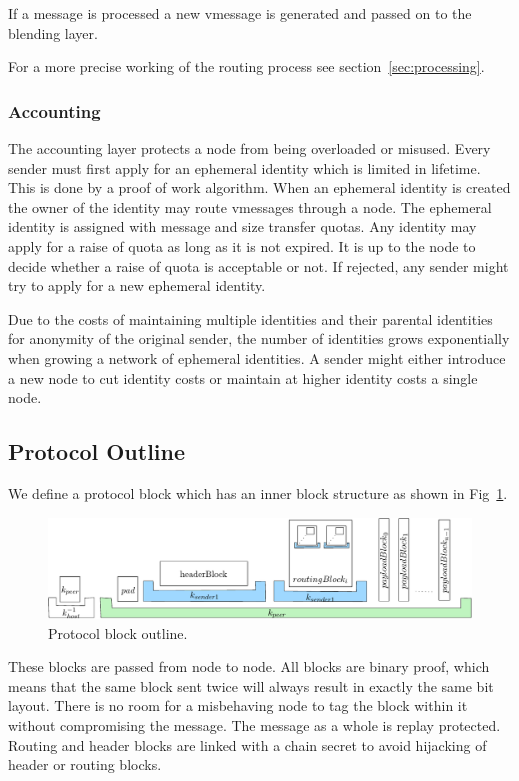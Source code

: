 \documentclass[9pt,journal,compsoc]{IEEEtran}
\begin{document}
If a message is processed a new vmessage is generated and passed on to the blending layer.

For a more precise working of the routing process see section~\ref{sec:processing}.

\subsubsection{Accounting}
The accounting layer protects a node from being overloaded or misused. Every sender must first apply for an ephemeral identity which is limited in lifetime. This is done by a proof of work algorithm. When an ephemeral identity is created the owner of the identity may route vmessages through a node. The ephemeral identity is assigned with message and size transfer quotas. Any identity may apply for a raise of quota as long as it is not expired. It is up to the node to decide whether a raise of quota is acceptable or not. If rejected, any sender might try to apply for a new ephemeral identity.

Due to the costs of maintaining multiple identities and their parental identities for anonymity of the original sender, the number of identities grows exponentially when growing a network of ephemeral identities. A sender might either introduce a new node to cut identity costs or maintain at higher identity costs a single node.

\subsection{Protocol Outline}
We define a protocol block which has an inner block structure as shown in Fig~\ref{fig:blocks}.

\begin{figure}[htb]
	\centering
	\includegraphics[width=\columnwidth]{../inc/blockLayoutSimplified}
	\caption{Protocol block outline.}
	\label{fig:blocks}
\end{figure}

These blocks are passed from node to node. All blocks are binary proof, which means that the same block sent twice will always result in exactly the same bit layout. There is no room for a misbehaving node to tag the block within it without compromising the message. The message as a whole is replay protected. Routing and header blocks are linked with a chain secret to avoid hijacking of header or routing blocks.
\end{document}
